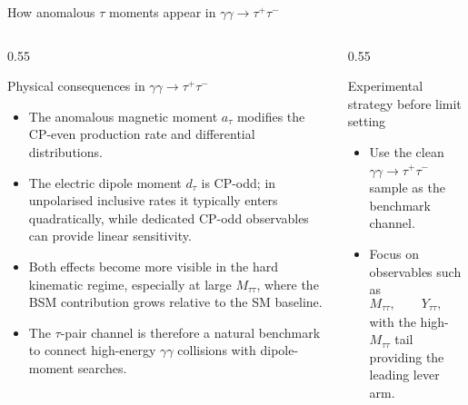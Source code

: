 \documentclass[aspectratio=1610,english]{beamer}
\begin{document}
\begin{frame}{How anomalous $\tau$ moments appear in $\gamma\gamma\to\tau^+\tau^-$}
	
\begin{columns}%
\begin{column}{0.55\textwidth}
			
\begin{block}{Physical consequences in $\gamma\gamma \to \tau^+\tau^-$}

\begin{itemize}
\scriptsize \justifying
\item The anomalous magnetic moment \(a_\tau\) modifies the
CP-even production rate and differential distributions.
					
\item The electric dipole moment \(d_\tau\) is CP-odd; in
unpolarised inclusive rates it typically enters quadratically, while
dedicated CP-odd observables can provide linear sensitivity.
					
\item Both effects become more visible in the hard kinematic regime,
especially at large \(M_{\tau\tau}\), where the BSM contribution grows
relative to the SM baseline.
					
\item The \(\tau\)-pair channel is therefore a natural benchmark to connect
high-energy \(\gamma\gamma\) collisions with dipole-moment searches.
\end{itemize}
\end{block}
			
	
\end{column}
		
\begin{column}{0.55\textwidth}
			
\begin{exampleblock}{Experimental strategy before limit setting}

\begin{itemize}
\scriptsize \justifying
\item Use the clean \(\gamma\gamma\to\tau^+\tau^-\) sample as the benchmark channel.
					
\item Focus on observables such as
\[
M_{\tau\tau},\qquad Y_{\tau\tau},\qquad p_T^\tau,
\]
with the high-\(M_{\tau\tau}\) tail providing the leading lever arm.
					

\end{itemize}
\end{exampleblock}
\end{column}
\end{columns}
\end{frame}
\end{document}
